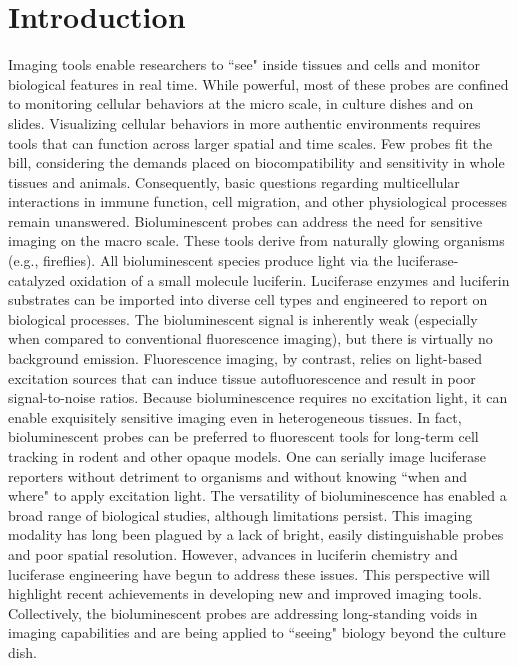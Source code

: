 
\chapter{Introduction}
Imaging tools enable researchers to ``see" inside tissues and
cells and monitor biological features in real time. While
powerful, most of these probes are confined to monitoring
cellular behaviors at the micro scale, in culture dishes and on
slides. Visualizing cellular behaviors in more authentic environments
requires tools that can function across larger spatial and
time scales.\cite{Porterfield:2015bu} Few probes fit the bill, considering the demands
placed on biocompatibility and sensitivity in whole tissues and
animals. Consequently, basic questions regarding multicellular
interactions in immune function, cell migration, and other
physiological processes remain unanswered.
Bioluminescent probes can address the need for sensitive
imaging on the macro scale. These tools derive from naturally
glowing organisms (e.g., fireflies). All bioluminescent species
produce light via the luciferase-catalyzed oxidation of a small
molecule luciferin. Luciferase enzymes and luciferin substrates
can be imported into diverse cell types and engineered to
report on biological processes.\cite{RN26} The bioluminescent signal is
inherently weak (especially when compared to conventional
fluorescence imaging), but there is virtually no background
emission. Fluorescence imaging, by contrast, relies on light-based
excitation sources that can induce tissue autofluorescence
and result in poor signal-to-noise ratios. Because bioluminescence
requires no excitation light, it can enable
exquisitely sensitive imaging even in heterogeneous tissues. In
fact, bioluminescent probes can be preferred to fluorescent
tools for long-term cell tracking in rodent and other opaque
models. One can serially image luciferase reporters without
detriment to organisms and without knowing ``when and
where" to apply excitation light.
The versatility of bioluminescence has enabled a broad range
of biological studies, although limitations persist.\cite{RN26} This imaging
modality has long been plagued by a lack of bright, easily
distinguishable probes and poor spatial resolution. However,
advances in luciferin chemistry and luciferase engineering have
begun to address these issues. This perspective will highlight
recent achievements in developing new and improved imaging
tools. Collectively, the bioluminescent probes are addressing
long-standing voids in imaging capabilities and are being
applied to ``seeing" biology beyond the culture dish.

